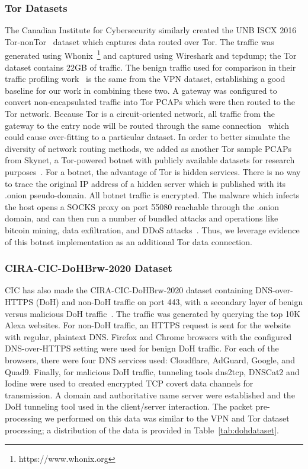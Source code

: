 \subsubsection{Tor Datasets}

The Canadian Institute for Cybersecurity similarly created the UNB ISCX 2016 Tor-nonTor~\cite{tor-dataset} dataset which captures data routed over Tor. The traffic was generated using Whonix~\footnote{https://www.whonix.org} and captured using Wireshark and tcpdump; the Tor dataset contains 22GB of traffic. The benign traffic used for comparison in their traffic profiling work~\cite{iscx-tor-paper} is the same from the VPN dataset, establishing a good baseline for our work in combining these two. A gateway was configured to convert non-encapsulated traffic into Tor PCAPs which were then routed to the Tor network. Because Tor is a circuit-oriented network, all traffic from the gateway to the entry node will be routed through the same connection~\cite{iscx-tor-paper} which could cause over-fitting to a particular dataset. In order to better simulate the diversity of network routing methods, we added as another Tor sample PCAPs from Skynet, a Tor-powered botnet with publicly available datasets for research purposes~\cite{skynet}. For a botnet, the advantage of Tor is hidden services. There is no way to trace the original IP address of a hidden server which is published with its .onion pseudo-domain. All botnet traffic is encrypted. The malware which infects the host opens a SOCKS proxy on port 55080 reachable through the .onion domain, and can then run a number of bundled attacks and operations like bitcoin mining, data exfiltration, and DDoS attacks~\cite{skynet}. Thus, we leverage evidence of this botnet implementation as an additional Tor data connection.

\subsubsection{CIRA-CIC-DoHBrw-2020 Dataset}
CIC has also made the CIRA-CIC-DoHBrw-2020 dataset containing DNS-over-HTTPS (DoH) and non-DoH traffic on port 443, with a secondary layer of benign versus malicious DoH traffic~\cite{iscx-doh-paper}. The traffic was generated by querying the top 10K Alexa websites. For non-DoH traffic, an HTTPS request is sent for the website with regular, plaintext DNS. Firefox and Chrome browsers with the configured DNS-over-HTTPS setting were used for benign DoH traffic. For each of the browsers, there were four DNS services used: Cloudflare, AdGuard, Google, and Quad9. Finally, for malicious DoH traffic, tunneling tools dns2tcp, DNSCat2 and Iodine were used to created encrypted TCP covert data channels for transmission. A domain and authoritative name server were established and the DoH tunneling tool used in the client/server interaction. The packet pre-processing we performed on this data was similar to the VPN and Tor dataset processing; a distribution of the data is provided in Table~\ref{tab:dohdataset}.

